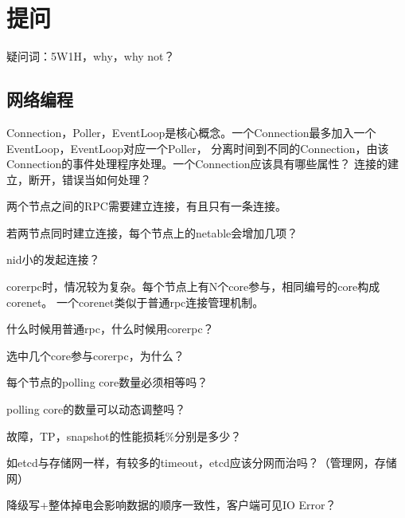 \chapter{提问}

疑问词：5W1H，why，why not？

\section{网络编程}

Connection，Poller，EventLoop是核心概念。一个Connection最多加入一个EventLoop，EventLoop对应一个Poller，
分离时间到不同的Connection，由该Connection的事件处理程序处理。一个Connection应该具有哪些属性？
连接的建立，断开，错误当如何处理？

两个节点之间的RPC需要建立连接，有且只有一条连接。
\begin{compactenum}
\item 若两节点同时建立连接，每个节点上的netable会增加几项？
\item nid小的发起连接？
\end{compactenum}

corerpc时，情况较为复杂。每个节点上有N个core参与，相同编号的core构成corenet。
一个corenet类似于普通rpc连接管理机制。

\begin{compactenum}
\item 什么时候用普通rpc，什么时候用corerpc？
\item 选中几个core参与corerpc，为什么？
\item 每个节点的polling core数量必须相等吗？
\item polling core的数量可以动态调整吗？
\end{compactenum}

故障，TP，snapshot的性能损耗\%分别是多少？

如etcd与存储网一样，有较多的timeout，etcd应该分网而治吗？（管理网，存储网）

降级写+整体掉电会影响数据的顺序一致性，客户端可见IO Error？
